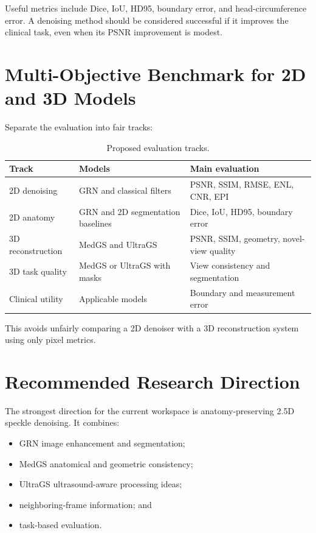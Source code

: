 \documentclass[11pt,a4paper]{article}
\begin{document}
Useful metrics include Dice, IoU, HD95, boundary error, and head-circumference error. A denoising method should be considered successful if it improves the clinical task, even when its PSNR improvement is modest.

\section{Multi-Objective Benchmark for 2D and 3D Models}

Separate the evaluation into fair tracks:

\begin{table}[h]
\centering
\caption{Proposed evaluation tracks.}
\begin{tabular}{p{} p{} p{}}
\toprule
Track & Models & Main evaluation \\
\midrule
2D denoising & GRN and classical filters & PSNR, SSIM, RMSE, ENL, CNR, EPI \\
2D anatomy & GRN and 2D segmentation baselines & Dice, IoU, HD95, boundary error \\
3D reconstruction & MedGS and UltraGS & PSNR, SSIM, geometry, novel-view quality \\
3D task quality & MedGS or UltraGS with masks & View consistency and segmentation \\
Clinical utility & Applicable models & Boundary and measurement error \\
\bottomrule
\end{tabular}
\end{table}

This avoids unfairly comparing a 2D denoiser with a 3D reconstruction system using only pixel metrics.

\section{Recommended Research Direction}

The strongest direction for the current workspace is anatomy-preserving 2.5D speckle denoising. It combines:
\begin{itemize}
    \item GRN image enhancement and segmentation;
    \item MedGS anatomical and geometric consistency;
    \item UltraGS ultrasound-aware processing ideas;
    \item neighboring-frame information; and
    \item task-based evaluation.
\end{itemize}
\end{document}
